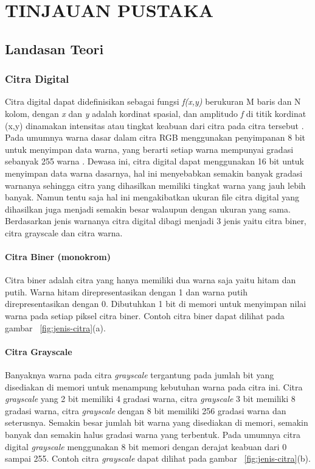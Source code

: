 
\chapter{TINJAUAN PUSTAKA}


\section{Landasan Teori}

\subsection{Citra Digital}
Citra digital dapat didefinisikan sebagai fungsi \textit{f(x,y)} berukuran M baris dan N kolom, dengan \textit{x} dan \textit{y} adalah kordinat spasial, dan amplitudo \textit{f} di titik kordinat (x,y) dinamakan intensitas atau tingkat keabuan dari citra pada citra tersebut \cite{book:darma}. Pada umumnya warna dasar dalam citra RGB menggunakan penyimpanan 8 bit untuk menyimpan data warna, yang berarti setiap warna mempunyai gradasi sebanyak 255 warna . Dewasa ini, citra digital dapat menggunakan 16 bit untuk menyimpan data warna dasarnya, hal ini menyebabkan semakin banyak gradasi warnanya sehingga citra yang dihasilkan memiliki tingkat warna yang jauh lebih banyak. Namun tentu saja hal ini mengakibatkan ukuran file citra digital yang dihasilkan juga menjadi semakin besar walaupun dengan ukuran yang sama. Berdasarkan jenis warnanya citra digital dibagi menjadi 3 jenis yaitu citra biner, citra grayscale dan citra warna.

\subsubsection{Citra Biner (monokrom)} 
Citra biner adalah citra yang hanya memiliki dua warna saja yaitu hitam dan putih. Warna hitam direpresentasikan dengan 1 dan warna putih direpresentasikan dengan 0. Dibutuhkan 1 bit di memori untuk menyimpan nilai warna pada setiap piksel citra biner. Contoh citra biner dapat dilihat pada gambar ~\ref{fig:jenis-citra}(a).

\subsubsection{Citra Grayscale}
Banyaknya warna pada citra \textit{grayscale} tergantung pada jumlah bit yang disediakan di memori untuk menampung kebutuhan warna pada citra ini. Citra \textit{grayscale} yang 2 bit memiliki 4 gradasi warna, citra \textit{grayscale} 3 bit memiliki 8 gradasi warna, citra \textit{grayscale} dengan 8 bit memiliki 256 gradasi warna dan seterusnya. Semakin besar jumlah bit warna yang disediakan di memori, semakin banyak dan semakin halus gradasi warna yang terbentuk. Pada umumnya citra digital \textit{grayscale} menggunakan 8 bit memori dengan derajat keabuan dari 0 sampai 255. Contoh citra \textit{grayscale} dapat dilihat pada gambar ~\ref{fig:jenis-citra}(b).

